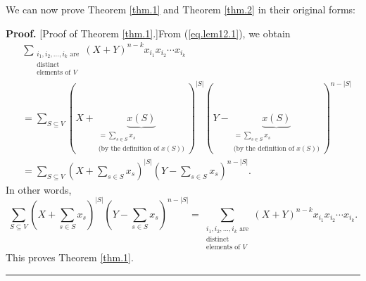 \documentclass[numbers=enddot,12pt,final,onecolumn,notitlepage]{scrartcl}%
\theoremstyle{definition}
\newenvironment{proof}[1][Proof]{\noindent\textbf{#1.} }{\ \rule{0.5em}{0.5em}}
\let\sumnonlimits\sum
\renewcommand{\sum}{\sumnonlimits\limits}
\newenvironment{verlong}{}{}
\begin{document}
\begin{verlong}
We can now prove Theorem \ref{thm.1} and Theorem \ref{thm.2} in their original forms:

\begin{proof}
[Proof of Theorem \ref{thm.1}.]From (\ref{eq.lem12.1}), we obtain%
\begin{align*}
&  \sum_{\substack{i_{1},i_{2},\ldots,i_{k}\text{ are}\\\text{distinct}%
\\\text{elements of }V}}\left(  X+Y\right)  ^{n-k}x_{i_{1}}x_{i_{2}}\cdots
x_{i_{k}}\\
&  =\sum_{S\subseteq V}\left(  X+\underbrace{x\left(  S\right)  }%
_{\substack{=\sum_{s\in S}x_{s}\\\text{(by the definition of }x\left(
S\right)  \text{)}}}\right)  ^{\left\vert S\right\vert }\left(
Y-\underbrace{x\left(  S\right)  }_{\substack{=\sum_{s\in S}x_{s}\\\text{(by
the definition of }x\left(  S\right)  \text{)}}}\right)  ^{n-\left\vert
S\right\vert }\\
&  =\sum_{S\subseteq V}\left(  X+\sum_{s\in S}x_{s}\right)  ^{\left\vert
S\right\vert }\left(  Y-\sum_{s\in S}x_{s}\right)  ^{n-\left\vert S\right\vert
}.
\end{align*}
In other words,%
\[
\sum_{S\subseteq V}\left(  X+\sum_{s\in S}x_{s}\right)  ^{\left\vert
S\right\vert }\left(  Y-\sum_{s\in S}x_{s}\right)  ^{n-\left\vert S\right\vert
}=\sum_{\substack{i_{1},i_{2},\ldots,i_{k}\text{ are}\\\text{distinct}%
\\\text{elements of }V}}\left(  X+Y\right)  ^{n-k}x_{i_{1}}x_{i_{2}}\cdots
x_{i_{k}}.
\]
This proves Theorem \ref{thm.1}.
\end{proof}


\end{verlong}
\end{document}
